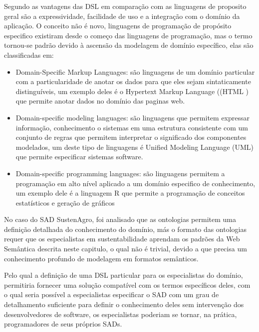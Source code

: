Segundo \citet{Mernik:2005:DDL:1118890.1118892} as vantagens das
DSL em comparação com as linguagens de proposito geral são a expressividade,
facilidade de uso e a integração com o domínio da aplicação. O conceito
não é novo, linguagens de programação de propósito especifico existiram
desde o começo das linguagens de programação, mas o termo tornou-se
padrão devido à ascensão da modelagem de domínio específico, elas
são classificadas em:
%
\begin{itemize}
\item Domain-Specific Markup Languages\foreignlanguage{brazil}{: são linguagens
de um domínio particular com a particularidade de anotar os dados
para que eles sejam sintaticamente distinguíveis, um exemplo deles
é o }Hypertext Markup Language ((HTML )\foreignlanguage{brazil}{
que permite anotar dados no domínio das paginas web.}
\item Domain-specific modeling languages:\foreignlanguage{brazil}{ são linguagens
que permitem expressar informação, conhecimento o sistemas em uma
estrutura consistente com um conjunto de regras que permitem interpretar
o significado dos componentes modelados, um deste tipo de linguagens
é }Unified Modeling Language\foreignlanguage{brazil}{ (}UML\foreignlanguage{brazil}{)
que permite especificar sistemas software.}
\item Domain-specific programming languages:\foreignlanguage{brazil}{ são
linguagens permitem a programação em alto nível aplicado a um domínio
especifico de conhecimento, um exemplo dele é a linguagem R que permite
a programação de conceitos estatísticos e geração de gráficos }
\end{itemize}
%
No caso do SAD SustenAgro, foi analisado que as ontologias permitem
uma definição detalhada do conhecimento do domínio, más o formato
das ontologias requer que os especialistas em sustentabilidade aprendam
os padrões da Web Semântica descrita neste capitulo, o qual não é
trivial, devido a que precisa um conhecimento profundo de modelagem
em formatos semânticos.

Pelo qual a definição de uma DSL particular para os especialistas
do domínio, permitiria fornecer uma solução compatível com os termos
específicos deles, com o qual seria possível a especialistas especificar
o SAD com um grau de detalhamento suficiente para definir o conhecimento
deles sem intervenção dos desenvolvedores de software, os especialistas
poderiam se tornar, na prática, programadores de seus próprios SADs.

